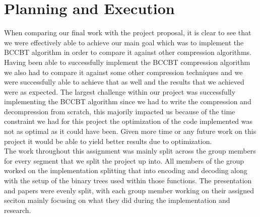 \documentclass[12pt]{IEEEtran}
\begin{document}
\section{Planning and Execution}

When comparing our final work with the project proposal, it is clear to see that we were effectively able
to achieve our main goal which was to implement the BCCBT algorithm in order to compare it against other
compression algorithms.  Having been able to successfully implement the BCCBT compression algorithm we 
also had to compare it against some other compression techniques and we were successfully able to achieve 
that as well and the results that we achieved were as expected.  The largest challenge within our
project was successfully implementing the BCCBT algorithm since we had to write the compression and 
decompression from scratch, this majorily impacted us because of the time constraint we had for this 
project the optimization of the code implemented was not as optimal as it could have been.  Given more 
time or any future work on this project it would be able to yield better results due to optimization.\\

The work throughout this assignment was mainly split across the group members for every segment that 
we split the project up into.  All members of the group worked on the implementation splitting that 
into encoding and decoding along with the setup of the binary trees used within those functions.  The 
presentation and papers were evenly split, with each group member working on their assigned seciton mainly
focusing on what they did during the implementation and research.




\end{document}
